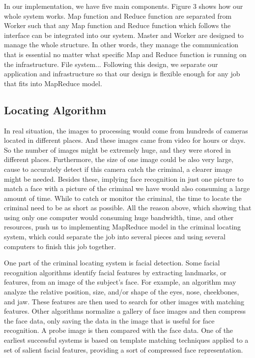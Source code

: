 \documentclass[12pt]{article}
\begin{document}
In our implementation, we have five main components.  Figure 3 shows how our whole system works.
Map function and Reduce function are separated from Worker such that any Map function and Reduce function which
follows the interface can be integrated into our system.
Master and Worker are designed to manage the whole structure. In other words, they manage the communication that
is essential no matter what specific Map and Reduce function is running on the infrastructure.
File system...
Following this design, we separate our application and infrastructure so that our design is flexible enough
for any job that fits into MapReduce model. 
\subsection{Locating Algorithm }

In real situation, the images to processing would come from hundreds of cameras located in different places. And these images came from video for hours or days. So the number of images might be extremely huge, and they were stored in different places. Furthermore, the size of one image could be also very large, cause to accurately detect if this camera catch the criminal, a clearer image might be needed. Besides these, implying face recognition in just one picture to match a face with a picture of the criminal we have would also consuming a large amount of time. While to catch or monitor the criminal, the time to locate the criminal need to be as short as possible. All the reason above, which showing that using only one computer would consuming huge bandwidth, time, and other resources, push us to implementing MapReduce model in the criminal locating system, which could separate the job into several pieces and using several computers to finish this job together. 

One part of the criminal locating system is facial detection. Some facial recognition algorithms identify facial features by extracting landmarks, or features, from an image of the subject's face. For example, an algorithm may analyze the relative position, size, and/or shape of the eyes, nose, cheekbones, and jaw. These features are then used to search for other images with matching features. Other algorithms normalize a gallery of face images and then compress the face data, only saving the data in the image that is useful for face recognition. A probe image is then compared with the face data. One of the earliest successful systems is based on template matching techniques applied to a set of salient facial features, providing a sort of compressed face representation.
\end{document}
